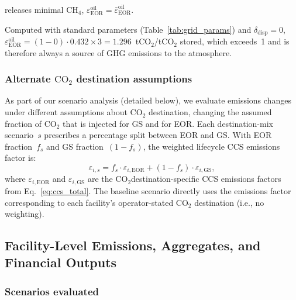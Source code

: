 \documentclass[11pt]{article}
\newcommand{\cotwo}{\ensuremath{\mathrm{CO_2}}}
\newcommand{\chfour}{\ensuremath{\mathrm{CH_4}}}
\begin{document}
releases minimal \chfour{}, $\varepsilon_{\text{EOR}}^{\text{oil}} = \bar\varepsilon_{\text{EOR}}^{\text{oil}}$.

Computed with standard parameters (Table~\ref{tab:grid_params}) and $\delta_{\text{disp}} = 0$, $\varepsilon_{\text{EOR}}^{\text{oil}} = (1 - 0) \cdot 0.432 \times 3 = 1.296$~t\cotwo{}/t\cotwo{} stored, which exceeds~1 and is therefore always a source of GHG emissions to the atmosphere.

\subsubsection{Alternate \cotwo{} destination assumptions}
\label{sec:dest_mix}

As part of our scenario analysis (detailed below), we evaluate emissions changes under different assumptions about \cotwo{} destination, changing the assumed fraction of \cotwo{} that is injected for GS and for EOR. Each destination-mix scenario~$s$ prescribes a percentage split between EOR and GS.
With EOR fraction~$f_s$ and GS fraction~$(1 - f_s)$, the weighted lifecycle CCS emissions factor is:
%
\begin{equation}
  \varepsilon_{i,s} = f_s \cdot \varepsilon_{i,\text{EOR}}
                    + (1 - f_s) \cdot \varepsilon_{i,\text{GS}},
  \label{eq:weighted}
\end{equation}
%
where $\varepsilon_{i,\text{EOR}}$ and $\varepsilon_{i,\text{GS}}$ are the \cotwo{}destination-specific CCS emissions factors from Eq.~\eqref{eq:ccs_total}.
The baseline scenario directly uses the emissions factor corresponding to each facility's operator-stated \cotwo{} destination (i.e., no weighting).

\subsection{Facility-Level Emissions, Aggregates, and Financial Outputs}
\label{sec:project}

\subsubsection{Scenarios evaluated}
\label{sec:scenarios}
\end{document}
